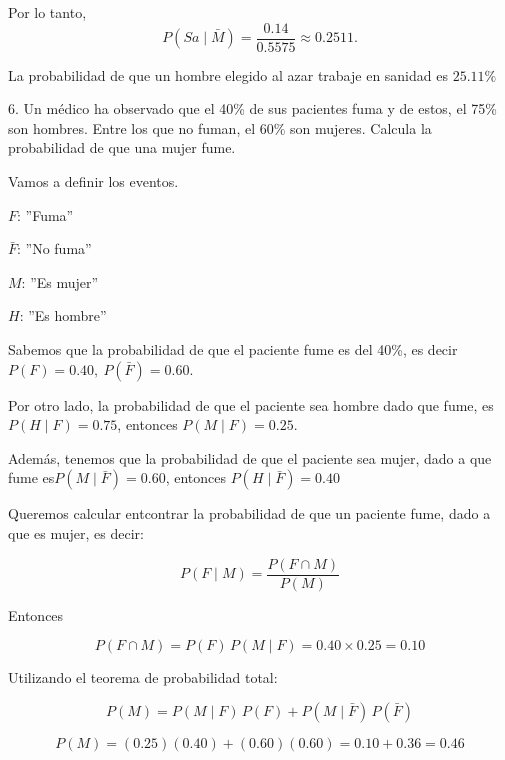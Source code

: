 Por lo tanto,
$$P(Sa\mid \bar{M})=\frac{0.14}{0.5575}\approx 0.2511.$$

La probabilidad de que un hombre elegido al azar trabaje en sanidad es $\boxed{25.11\%}$

\QED

\vspace{0.8cm}

6. Un médico ha observado que el 40\% de sus pacientes fuma y de estos, 
el 75\% son hombres. Entre los que no fuman, el 60\% son mujeres. 
Calcula la probabilidad de que una mujer fume.

\vspace{0.5cm}

Vamos a definir los eventos. 

$F$: ''Fuma''

$\bar{F}$: ''No fuma''

$M$: ''Es mujer''

$H$: ''Es hombre''

\vspace{0.4cm}

Sabemos que la probabilidad de que el paciente fume es del 40\%, es decir
$P(F) = 0.40,\ P(\bar{F}) = 0.60$. 
\vspace{0.2cm}

Por otro lado, la probabilidad de que el paciente sea hombre dado que fume, 
es $P(H \mid F) = 0.75$, entonces $P(M \mid F) = 0.25$.
\vspace{0.2cm}

Además, tenemos que la probabilidad de que el paciente sea mujer, dado a que fume es$P(M \mid \bar{F}) = 0.60$, entonces $P(H \mid \bar{F}) = 0.40$
\vspace{0.2cm}

Queremos calcular entcontrar la probabilidad de que un paciente fume, dado a que es 
mujer, es decir:
\vspace{0.2cm}

$$P(F \mid M) = \frac{P(F \cap M)}{P(M)}$$

Entonces

$$P(F \cap M) = P(F)\, P(M \mid F) = 0.40 \times 0.25 = 0.10$$

\vspace{0.2cm}

Utilizando el teorema de probabilidad total:

$$P(M) = P(M \mid F)\, P(F) + P(M \mid \bar{F})\, P(\bar{F})$$

$$P(M) = (0.25)(0.40) + (0.60)(0.60) = 0.10 + 0.36 = 0.46$$

